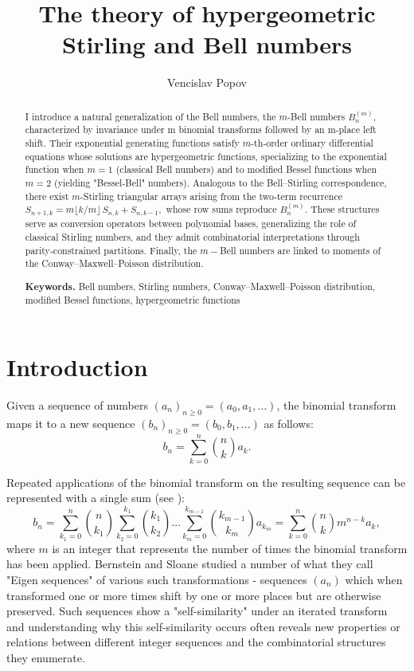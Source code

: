 \documentclass[a4paper]{amsart}
\title[The theory of hypergeometric Stirling and Bell numbers]{The theory of hypergeometric Stirling and Bell numbers}
\author{Vencislav Popov}
\date{}
\begin{document}
\begin{abstract}
I introduce a natural generalization of the Bell numbers, the $m$-Bell numbers $B^{(m)}_{n}$, characterized by invariance under m binomial transforms followed by an m-place left shift.  Their exponential generating functions satisfy $m$-th‑order ordinary differential equations whose solutions are hypergeometric functions, specializing to the exponential function when $m=1$ (classical Bell numbers) and to modified Bessel functions when $m=2$ (yielding "Bessel-Bell" numbers). Analogous to the Bell–Stirling correspondence, there exist \(m\)-Stirling triangular arrays arising from the two‑term recurrence  $S_{n+1,k}=m\!\lfloor k/m\rfloor\,S_{n,k}+S_{n,k-1},$ whose row sums reproduce $B^{(m)}_{n}$. These structures serve as conversion operators between polynomial bases, generalizing the role of classical Stirling numbers, and they admit combinatorial interpretations through parity‑constrained partitions. Finally, the $m-$Bell numbers are linked to moments of the Conway–Maxwell–Poisson distribution.

\bigskip
\noindent\textbf{Keywords.} Bell numbers, Stirling numbers, Conway–Maxwell–Poisson distribution, modified Bessel functions, hypergeometric functions
\end{abstract}

\maketitle

\section{Introduction}\label{sec-introduction}
\noindent Given a sequence of numbers $(a_n)_{n \geq 0} = (a_0, a_1, \ldots)$, the binomial transform maps it to a new sequence $(b_n)_{n \geq 0} = (b_0,b_1,...)$ as follows:
\begin{equation*}
    b_n = \sum_{k=0}^{n} \binom{n}{k} a_k.
\end{equation*}

Repeated applications of the binomial transform on the resulting sequence can be represented with a single sum (see \cite{spiveyKbinomialTransformsHankel2006}):
\begin{equation*}
    b_n = \sum_{k_1=0}^{n} \binom{n}{k_1}\sum_{k_2=0}^{k_1} \binom{k_1}{k_2} \dots \sum_{k_{m}=0}^{k_{m-1}} \binom{k_{m-1}}{k_m} a_{k_m} = \sum_{k=0}^{n} \binom{n}{k} m^{n-k} a_k,
\end{equation*}
where $m$ is an integer that represents the number of times the binomial transform has been applied. Bernstein and Sloane \cite{bernstein1995} studied a number of what they call "Eigen sequences" of various such transformations - sequences $(a_n)$ which when transformed one or more times shift by one or more places but are otherwise preserved. Such sequences show a "self-similarity" under an iterated transform and understanding why this self-similarity occurs often reveals new properties or relations between different integer sequences and the combinatorial structures they enumerate.
\end{document}
